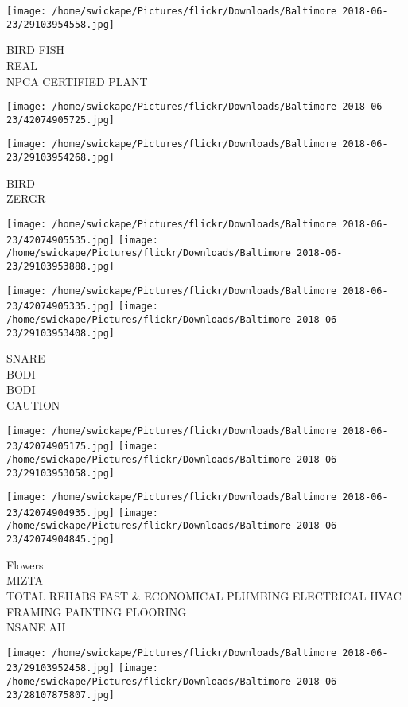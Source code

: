 \documentclass[10pt,letterpaper]{article}
\begin{document}
\texttt{[image: /home/swickape/Pictures/flickr/Downloads/Baltimore 2018-06-23/29103954558.jpg]}

BIRD FISH\\
REAL\\
NPCA CERTIFIED PLANT\\
\pagebreak

\texttt{[image: /home/swickape/Pictures/flickr/Downloads/Baltimore 2018-06-23/42074905725.jpg]}

\vspace{0.25in}
\texttt{[image: /home/swickape/Pictures/flickr/Downloads/Baltimore 2018-06-23/29103954268.jpg]}

BIRD\\
ZERGR\\
\pagebreak

\texttt{[image: /home/swickape/Pictures/flickr/Downloads/Baltimore 2018-06-23/42074905535.jpg]}
\texttt{[image: /home/swickape/Pictures/flickr/Downloads/Baltimore 2018-06-23/29103953888.jpg]}

\texttt{[image: /home/swickape/Pictures/flickr/Downloads/Baltimore 2018-06-23/42074905335.jpg]}
\texttt{[image: /home/swickape/Pictures/flickr/Downloads/Baltimore 2018-06-23/29103953408.jpg]}

SNARE\\
BODI\\
BODI\\
CAUTION\\
\pagebreak

\texttt{[image: /home/swickape/Pictures/flickr/Downloads/Baltimore 2018-06-23/42074905175.jpg]}
\texttt{[image: /home/swickape/Pictures/flickr/Downloads/Baltimore 2018-06-23/29103953058.jpg]}

\texttt{[image: /home/swickape/Pictures/flickr/Downloads/Baltimore 2018-06-23/42074904935.jpg]}
\texttt{[image: /home/swickape/Pictures/flickr/Downloads/Baltimore 2018-06-23/42074904845.jpg]}

Flowers\\
MIZTA\\
TOTAL REHABS FAST \& ECONOMICAL PLUMBING ELECTRICAL HVAC FRAMING PAINTING FLOORING\\
NSANE AH\\
\pagebreak

\texttt{[image: /home/swickape/Pictures/flickr/Downloads/Baltimore 2018-06-23/29103952458.jpg]}
\texttt{[image: /home/swickape/Pictures/flickr/Downloads/Baltimore 2018-06-23/28107875807.jpg]}
\end{document}
